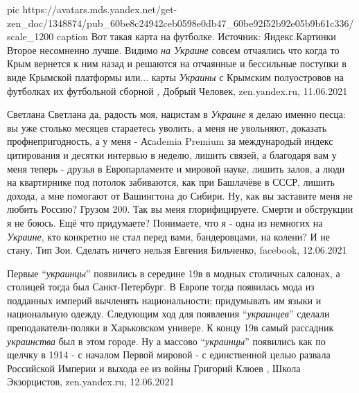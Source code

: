 \ifcmt
  pic https://avatars.mds.yandex.net/get-zen_doc/1348874/pub_60be8c24942ceb0598e0db47_60be92f52b92e05b9b61c336/scale_1200
	caption Вот такая карта на футболке. Источник: Яндекс.Картинки
\fi
Второе несомненно лучше. Видимо \emph{на Украине} совсем отчаялись что когда то
Крым вернется к ним назад и решаются на отчаянные и бессильные поступки в виде
Крымской платформы или... карты \emph{Украины} с Крымским полуостровов на
футболках их футбольной сборной
, 
Добрый Человек, zen.yandex.ru, 11.06.2021

Светлана Светлана да, радость моя, нацистам в \emph{Украине} я делаю именно
песца: вы уже столько месяцев стараетесь уволить, а меня не увольняют, доказать
профнепригодность, а у меня - Асademia Premium за международый индекс
цитирования и десятки интервью в неделю, лишить связей, а благодаря вам у меня
теперь - друзья в Европарламенте и мировой науке, лишить залов, а люди на
квартирнике под потолок забиваются, как при Башлачёве в СССР, лишить дохода, а
мне помогают от Вашингтона до Сибири. Ну, как вы заставите меня не любить
Россию? Грузом 200. Так вы меня глорифицируете. Смерти и обструкции я не боюсь.
Ещё что придумаете? Понимаете, что я - одна из немногих на \emph{Украине}, кто
конкретно не стал перед вами, бандеровцами, на колени? И не стану. Тип Зои.
Сделать ничего нельзя
Евгения Бильченко, facebook, 12.06.2021

  
Первые \enquote{\emph{украинцы}} появились в середине 19в в модных столичных салонах, а
столицей тогда был Санкт-Петербург. В Европе тогда появилась мода из подданных
империй вычленять национальности; придумывать им языки и национальную одежду.
Следующим ход для появления \enquote{\emph{украинцев}} сделали преподаватели-поляки в
Харьковском универе. К концу 19в самый рассадник \emph{украинства} был в этом городе.
Ну а массово \enquote{\emph{украинцы}} появились как по щелчку в 1914 - с началом Первой
мировой - с единственной целью развала Российской Империи и выхода ее из войны
Григорий Клюев
, 
Школа Экзорцистов, zen.yandex.ru, 12.06.2021

